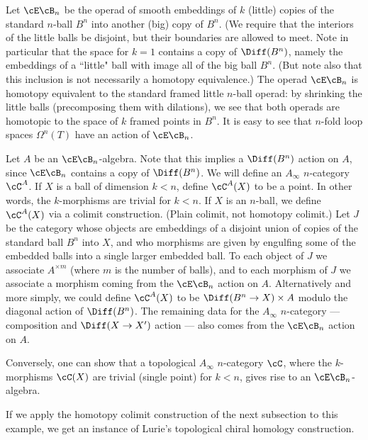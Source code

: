 Let $\cE\cB_n$ be the operad of smooth embeddings of $k$ (little)
copies of the standard $n$-ball $B^n$ into another (big) copy of $B^n$.
(We require that the interiors of the little balls be disjoint, but their 
boundaries are allowed to meet.
Note in particular that the space for $k=1$ contains a copy of $\Diff(B^n)$, namely
the embeddings of a ``little" ball with image all of the big ball $B^n$.
(But note also that this inclusion is not
necessarily a homotopy equivalence.)
The operad $\cE\cB_n$ is homotopy equivalent to the standard framed little $n$-ball operad:
by shrinking the little balls (precomposing them with dilations), 
we see that both operads are homotopic to the space of $k$ framed points
in $B^n$.
It is easy to see that $n$-fold loop spaces $\Omega^n(T)$  have
an action of $\cE\cB_n$.

\begin{example}[$E_n$ algebras]
\rm
\label{ex:e-n-alg}
Let $A$ be an $\cE\cB_n$-algebra.
Note that this implies a $\Diff(B^n)$ action on $A$, 
since $\cE\cB_n$ contains a copy of $\Diff(B^n)$.
We will define an $A_\infty$ $n$-category $\cC^A$.
If $X$ is a ball of dimension $k<n$, define $\cC^A(X)$ to be a point.
In other words, the $k$-morphisms are trivial for $k<n$.
If $X$ is an $n$-ball, we define $\cC^A(X)$ via a colimit construction.
(Plain colimit, not homotopy colimit.)
Let $J$ be the category whose objects are embeddings of a disjoint union of copies of 
the standard ball $B^n$ into $X$, and who morphisms are given by engulfing some of the 
embedded balls into a single larger embedded ball.
To each object of $J$ we associate $A^{\times m}$ (where $m$ is the number of balls), and
to each morphism of $J$ we associate a morphism coming from the $\cE\cB_n$ action on $A$.
Alternatively and more simply, we could define $\cC^A(X)$ to be 
$\Diff(B^n\to X)\times A$ modulo the diagonal action of $\Diff(B^n)$.
The remaining data for the $A_\infty$ $n$-category 
--- composition and $\Diff(X\to X')$ action ---
also comes from the $\cE\cB_n$ action on $A$.

Conversely, one can show that a topological $A_\infty$ $n$-category $\cC$, where the $k$-morphisms
$\cC(X)$ are trivial (single point) for $k<n$, gives rise to 
an $\cE\cB_n$-algebra.

If we apply the homotopy colimit construction of the next subsection to this example, 
we get an instance of Lurie's topological chiral homology construction.
\end{example}


